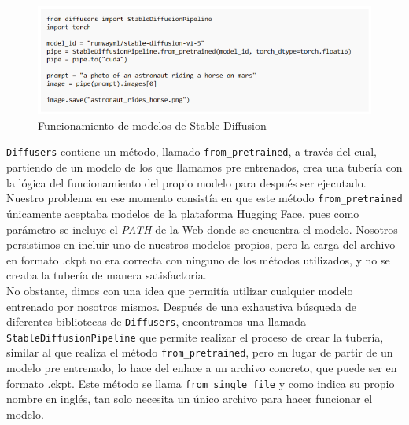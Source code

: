 	
	


\begin{figure}[!htb]
	\centering
	\includegraphics[width = 1
	\textwidth]{Imagenes/Vectorial/codigoapp.png}
	\caption{Funcionamiento de modelos de Stable Diffusion}
	\label{fig:codigoapp}
\end{figure}


\texttt{Diffusers} contiene un método, llamado \texttt{from\_pretrained}, a través del cual, partiendo de un modelo de los que llamamos pre entrenados, crea una tubería con la lógica del funcionamiento del propio modelo para después ser ejecutado. Nuestro problema  en ese momento consistía en que este método \texttt{from\_pretrained} únicamente aceptaba modelos de la plataforma Hugging Face, pues como parámetro se incluye el \textit{PATH} de la Web donde se encuentra el modelo. Nosotros persistimos en incluir uno de nuestros modelos propios, pero la carga del archivo en formato .ckpt no era correcta con ninguno de los métodos utilizados, y no se creaba la tubería de manera satisfactoria. \\

No obstante, dimos con una idea que permitía utilizar cualquier modelo entrenado por nosotros mismos. Después de una exhaustiva búsqueda de diferentes bibliotecas de \texttt{Diffusers}, encontramos una llamada \texttt{StableDiffusionPipeline} que permite realizar el proceso de crear la tubería, similar al que realiza el método \texttt{from\_pretrained}, pero en lugar de partir de un modelo pre entrenado, lo hace del enlace a un archivo concreto, que puede ser en formato .ckpt. Este método se llama \texttt{from\_single\_file} y como indica su propio nombre en inglés, tan solo necesita un único archivo para hacer funcionar el modelo.\\

